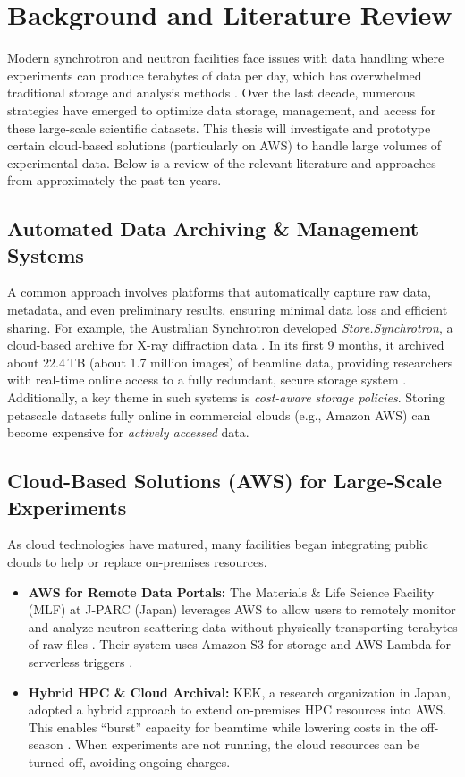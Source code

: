 \documentclass{article}
\begin{document}
\section{Background and Literature Review}

Modern synchrotron and neutron facilities face issues with data handling where experiments can produce terabytes of data per day, which has overwhelmed traditional storage and analysis methods \cite{wang2018synchrotron}. Over the last decade, numerous strategies have emerged to optimize data storage, management, and access for these large-scale scientific datasets. This thesis will investigate and prototype certain cloud-based solutions (particularly on AWS) to handle large volumes of experimental data. Below is a review of the relevant literature and approaches from approximately the past ten years.

\subsection{Automated Data Archiving \& Management Systems}
A common approach involves platforms that automatically capture raw data, metadata, and even preliminary results, ensuring minimal data loss and efficient sharing. For example, the Australian Synchrotron developed \emph{Store.Synchrotron}, a cloud-based archive for X-ray diffraction data \cite{meyer2014store}. In its first 9 months, it archived about 22.4\,TB (about 1.7 million images) of beamline data, providing researchers with real-time online access to a fully redundant, secure storage system \cite{meyer2014store}. Additionally, a key theme in such systems is \emph{cost-aware storage policies}. Storing petascale datasets fully online in commercial clouds (e.g., Amazon AWS) can become expensive for \emph{actively accessed} data.

\subsection{Cloud-Based Solutions (AWS) for Large-Scale Experiments}
As cloud technologies have matured, many facilities began integrating public clouds to help or replace on-premises resources.

\begin{itemize}
    \item \textbf{AWS for Remote Data Portals:} The Materials \& Life Science Facility (MLF) at J-PARC (Japan) leverages AWS to allow users to remotely monitor and analyze neutron scattering data without physically transporting terabytes of raw files \cite{moriyama2019public}. Their system uses Amazon S3 for storage and AWS Lambda for serverless triggers \cite{moriyama2019public}.

    \item \textbf{Hybrid HPC \& Cloud Archival:} KEK, a research organization in Japan, adopted a hybrid approach to extend on-premises HPC resources into AWS. This enables “burst” capacity for beamtime while lowering costs in the off-season \cite{kek2021aws}. When experiments are not running, the cloud resources can be turned off, avoiding ongoing charges.
\end{itemize}
\end{document}
